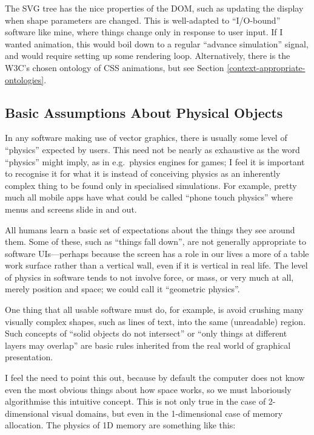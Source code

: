 The SVG tree has the nice properties of the DOM, such as updating the
display when shape parameters are changed. This is well-adapted to
``I/O-bound'' software like mine, where things change only in response
to user input. If I wanted animation, this would boil down to a regular
``advance simulation'' signal, and would require setting up some
rendering loop. Alternatively, there is the W3C's chosen ontology of CSS
animations, but see Section \ref{context-appropriate-ontologies}.

\hypertarget{basic-assumptions-about-physical-objects}{%
\subsection{Basic Assumptions About Physical
Objects}\label{basic-assumptions-about-physical-objects}}

In any software making use of vector graphics, there is usually some
level of ``physics'' expected by users. This need not be nearly as
exhaustive as the word ``physics'' might imply, as in e.g.~physics
engines for games; I feel it is important to recognise it for what it is
instead of conceiving physics as an inherently complex thing to be found
only in specialised simulations. For example, pretty much all mobile
apps have what could be called ``phone touch physics'' where menus and
screens slide in and out.

All humans learn a basic set of expectations about the things they see
around them. Some of these, such as ``things fall down'', are not
generally appropriate to software UIs---perhaps because the screen has a
role in our lives a more of a table work surface rather than a vertical
wall, even if it is vertical in real life. The level of physics in
software tends to not involve force, or mass, or very much at all,
merely position and space; we could call it ``geometric physics''.

One thing that all usable software must do, for example, is avoid
crushing many visually complex shapes, such as lines of text, into the
same (unreadable) region. Such concepts of ``solid objects do not
intersect'' or ``only things at different layers may overlap'' are basic
rules inherited from the real world of graphical presentation.

I feel the need to point this out, because by default the computer does
not know even the most obvious things about how space works, so we must
laboriously algorithmise this intuitive concept. This is not only true
in the case of 2-dimensional visual domains, but even in the
1-dimensional case of memory allocation. The physics of 1D memory are
something like this:

